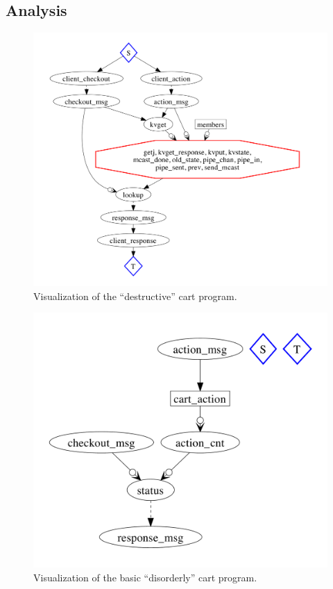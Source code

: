 \subsection{Analysis}

\begin{figure}[t]
\centering
\includegraphics[width=1.1\linewidth]{fig/destructive_kvs.pdf}
\vspace{-10pt}
\caption{Visualization of the ``destructive'' cart program.}
\label{fig:pdg-destructive-kvs-analysis}
\vspace{-2pt}
\end{figure}

\begin{figure}[t]
\centering
\includegraphics[width=0.8\linewidth]{fig/disorderly_base.pdf}
\vspace{-10pt}
\caption{Visualization of the basic ``disorderly'' cart program.}
\label{fig:pdg-disorderly-base}
\vspace{-2pt}
\end{figure}

